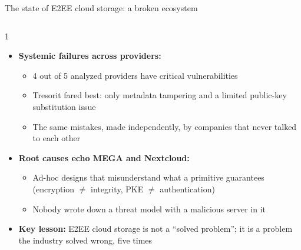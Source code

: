 \ifdefined\PRESENTATION\else\PassOptionsToClass{handout}{beamer}\fi\documentclass[aspectratio=169, lualatex]{beamer}
\begin{document}
\begin{frame}{The state of E2EE cloud storage: a broken ecosystem}
	\begin{columns}[c]
		\begin{column}{1\textwidth}
			\begin{itemize}
				\item \textbf{Systemic failures across providers:}
				      \begin{itemize}
					      \item 4 out of 5 analyzed providers have critical vulnerabilities
					      \item Tresorit fared best: only metadata tampering and a limited public-key substitution issue
					      \item The same mistakes, made independently, by companies that never talked to each other
				      \end{itemize}
				\item \textbf{Root causes echo MEGA and Nextcloud:}
				      \begin{itemize}
					      \item Ad-hoc designs that misunderstand what a primitive guarantees (encryption $\neq$ integrity, PKE $\neq$ authentication)
					      \item Nobody wrote down a threat model with a malicious server in it
				      \end{itemize}
				\item \textbf{Key lesson:} E2EE cloud storage is not a ``solved problem''; it is a problem the industry solved wrong, five times
			\end{itemize}
		\end{column}
	\end{columns}
\end{frame}
\end{document}
